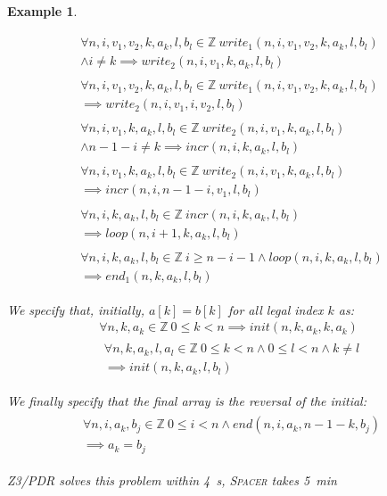 \documentclass[a4paper]{article}
\newcommand{\ZZ}{\mathbb{Z}}
\newcommand{\soft}[1]{\textsc{#1}}
\theoremstyle{definition}
\theoremstyle{plain}
\newtheorem{example}{Example}
\newcommand{\rulespacing}{\\[0.4em]}
\begin{document}
\begin{example}
{\begin{align}
\begin{aligned}
\end{aligned}\rulespacing
\begin{aligned}
\forall n,i,v_1,v_2,k,a_k,l,b_l \in \ZZ~
   \mathit{write}_1(n,i,v_1,v_2,k,a_k,l,b_l) \\ \land i\neq k \implies
   \mathit{write}_2(n,i,v_1,k,a_k,l,b_l)
\end{aligned}\rulespacing
\begin{aligned}
\forall n,i,v_1,v_2,k,a_k,l,b_l \in \ZZ~
   \mathit{write}_1(n,i,v_1,v_2,k,a_k,l,b_l) \\\implies
   \mathit{write}_2(n,i,v_1,i,v_2,l,b_l)
\end{aligned}\rulespacing
\begin{aligned}
\forall n,i,v_1,k,a_k,l,b_l \in \ZZ~
   \mathit{write}_2(n,i,v_1,k,a_k,l,b_l) \\\land n-1-i\neq k \implies
   \mathit{incr}(n,i,k,a_k,l,b_l)
\end{aligned}\rulespacing
\begin{aligned}
\forall n,i,v_1,k,a_k,l,b_l \in \ZZ~
   \mathit{write}_2(n,i,v_1,k,a_k,l,b_l) \\\implies
   \mathit{incr}(n,i,n-1-i,v_1,l,b_l)
\end{aligned}\rulespacing
\begin{aligned}
\forall n,i,k,a_k,l,b_l \in \ZZ~
   \mathit{incr}(n,i,k,a_k,l,b_l) \\\implies
   \mathit{loop}(n,i+1,k,a_k,l,b_l)
\end{aligned}\rulespacing
\begin{aligned}
\forall n,i,k,a_k,l,b_l \in \ZZ~
   i\geq n-i-1 \land \mathit{loop}(n,i,k,a_k,l,b_l) \\\implies
   \mathit{end}_1(n,k,a_k,l,b_l)
\end{aligned}
\end{align}
}

We specify that, initially, $a[k]=b[k]$ for all legal index $k$ as:
\begin{align}
\forall n,k,a_k \in \ZZ~ 0 \leq k < n \implies \mathit{init}(n,k,a_k,k,a_k)\\
\begin{aligned}
\forall n,k,a_k,l,a_l \in \ZZ~ 0 \leq k < n \land 0 \leq l < n \land k \neq l
  \\\implies \mathit{init}(n,k,a_k,l,b_l)
\end{aligned}
\end{align}

We finally specify that the final array is the reversal of the initial:
\begin{align}
\begin{aligned}
\forall n,i,a_k,b_j \in \ZZ~ 0 \leq i < n \land
  \mathit{end}(n, i, a_k, n-1-k, b_j)\\
  \implies a_k = b_j
\end{aligned}
\end{align}

\noindent\soft{Z3/PDR} solves this problem within 4~s, \soft{Spacer} takes 5~min
\end{example}
\end{document}
